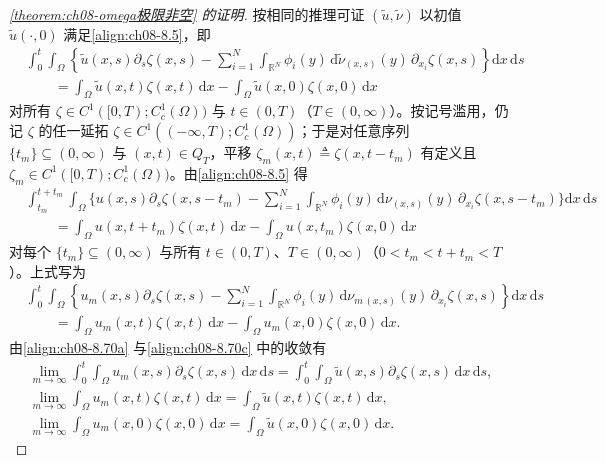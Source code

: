 \documentclass[../../main.tex]{subfiles}%
\begin{document}
\begin{proof}[\cref{theorem:ch08-omega极限非空} 的证明]
按相同的推理可证 $(\tilde u,\tilde\nu)$ 以初值 $\tilde u(\cdot,0)$ 满足\eqref{align:ch08-8.5}，即
\begin{align}
&\int_0^t\int_\Omega\left\{\tilde u(x,s)\partial_s\zeta(x,s)-\sum_{i=1}^N\int_{\mathbb{R}^N}\phi_i(y)\,\mathrm{d}\tilde\nu_{(x,s)}(y)\,\partial_{x_i}\zeta(x,s)\right\}\mathrm{d}x\,\mathrm{d}s\nonumber\\
&\qquad=\int_\Omega\tilde u(x,t)\zeta(x,t)\,\mathrm{d}x-\int_\Omega\tilde u(x,0)\zeta(x,0)\,\mathrm{d}x \label{align:ch08-8.87}
\end{align}
对所有 $\zeta\in C^1([0,T);C^1_c(\Omega))$ 与 $t\in(0,T)$（$T\in(0,\infty)$）。按记号滥用，仍记 $\zeta$ 的任一延拓 $\zeta\in C^1((-\infty,T);C^1_c(\Omega))$；于是对任意序列 $\{t_m\}\subseteq(0,\infty)$ 与 $(x,t)\in Q_T$，平移 $\zeta_m(x,t)\triangleq \zeta(x,t-t_m)$ 有定义且 $\zeta_m\in C^1([0,T);C^1_c(\Omega))$。由\eqref{align:ch08-8.5} 得
\begin{align*}
&\int_{t_m}^{t+t_m}\int_\Omega\Big\{u(x,s)\partial_s\zeta(x,s-t_m)
-\sum_{i=1}^N\int_{\mathbb{R}^N}\phi_i(y)\,\mathrm{d}\nu_{(x,s)}(y)\,\partial_{x_i}\zeta(x,s-t_m)\Big\}\mathrm{d}x\,\mathrm{d}s\\
&\qquad=\int_\Omega u(x,t+t_m)\zeta(x,t)\,\mathrm{d}x-\int_\Omega u(x,t_m)\zeta(x,0)\,\mathrm{d}x
\end{align*}
对每个 $\{t_m\}\subseteq(0,\infty)$ 与所有 $t\in(0,T)$、$T\in(0,\infty)$（$0<t_m<t+t_m<T$）。上式写为
\begin{align}
&\int_0^t\int_\Omega\left\{u_m(x,s)\partial_s\zeta(x,s)-\sum_{i=1}^N\int_{\mathbb{R}^N}\phi_i(y)\,\mathrm{d}\nu_{m\,(x,s)}(y)\,\partial_{x_i}\zeta(x,s)\right\}\mathrm{d}x\,\mathrm{d}s\nonumber\\
&\qquad=\int_\Omega u_m(x,t)\zeta(x,t)\,\mathrm{d}x-\int_\Omega u_m(x,0)\zeta(x,0)\,\mathrm{d}x. \label{align:ch08-8.88}
\end{align}
由\eqref{align:ch08-8.70a} 与\eqref{align:ch08-8.70c} 中的收敛有
\begin{align}
\lim_{m\to\infty}\int_0^t\int_\Omega u_m(x,s)\partial_s\zeta(x,s)\,\mathrm{d}x\,\mathrm{d}s
=\int_0^t\int_\Omega\tilde u(x,s)\partial_s\zeta(x,s)\,\mathrm{d}x\,\mathrm{d}s, \label{align:ch08-8.89a}\\
\lim_{m\to\infty}\int_\Omega u_m(x,t)\zeta(x,t)\,\mathrm{d}x
=\int_\Omega\tilde u(x,t)\zeta(x,t)\,\mathrm{d}x, \label{align:ch08-8.89b}\\
\lim_{m\to\infty}\int_\Omega u_m(x,0)\zeta(x,0)\,\mathrm{d}x
=\int_\Omega\tilde u(x,0)\zeta(x,0)\,\mathrm{d}x. \label{align:ch08-8.89c}
\end{align}

\end{proof}
\end{document}
